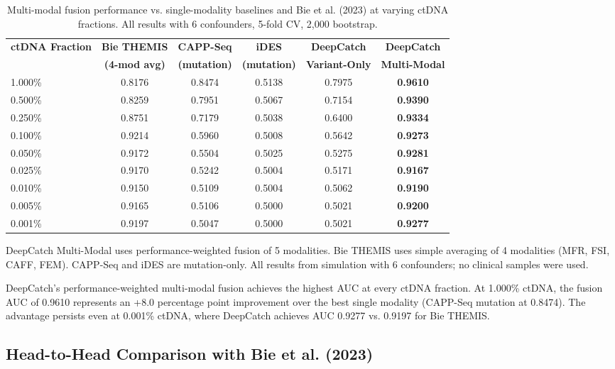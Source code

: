 \documentclass[10pt,a4paper]{article}
\begin{document}
\begin{table}[H]
\centering
\caption{Multi-modal fusion performance vs. single-modality baselines and Bie et al. (2023) at varying ctDNA fractions. All results with 6 confounders, 5-fold CV, 2,000 bootstrap.}
\label{tab:fusion_by_ctdna}
\begin{tabular}{l c c c c c}
\toprule
\textbf{ctDNA Fraction} & \textbf{Bie THEMIS} & \textbf{CAPP-Seq} & \textbf{iDES} & \textbf{DeepCatch} & \textbf{DeepCatch} \\
 & \textbf{(4-mod avg)} & \textbf{(mutation)} & \textbf{(mutation)} & \textbf{Variant-Only} & \textbf{Multi-Modal} \\
\midrule
1.000\% & 0.8176 & 0.8474 & 0.5138 & 0.7975 & \textbf{0.9610} \\
0.500\% & 0.8259 & 0.7951 & 0.5067 & 0.7154 & \textbf{0.9390} \\
0.250\% & 0.8751 & 0.7179 & 0.5038 & 0.6400 & \textbf{0.9334} \\
0.100\% & 0.9214 & 0.5960 & 0.5008 & 0.5642 & \textbf{0.9273} \\
0.050\% & 0.9172 & 0.5504 & 0.5025 & 0.5275 & \textbf{0.9281} \\
0.025\% & 0.9170 & 0.5242 & 0.5004 & 0.5171 & \textbf{0.9167} \\
0.010\% & 0.9150 & 0.5109 & 0.5004 & 0.5062 & \textbf{0.9190} \\
0.005\% & 0.9165 & 0.5106 & 0.5000 & 0.5021 & \textbf{0.9200} \\
0.001\% & 0.9197 & 0.5047 & 0.5000 & 0.5021 & \textbf{0.9277} \\
\bottomrule
\end{tabular}
\vspace{0.3cm}
\footnotesize{DeepCatch Multi-Modal uses performance-weighted fusion of 5 modalities. Bie THEMIS uses simple averaging of 4 modalities (MFR, FSI, CAFF, FEM). CAPP-Seq and iDES are mutation-only. All results from simulation with 6 confounders; no clinical samples were used.}
\end{table}

DeepCatch's performance-weighted multi-modal fusion achieves the highest AUC at every ctDNA fraction. At 1.000\% ctDNA, the fusion AUC of 0.9610 represents an +8.0 percentage point improvement over the best single modality (CAPP-Seq mutation at 0.8474). The advantage persists even at 0.001\% ctDNA, where DeepCatch achieves AUC 0.9277 vs. 0.9197 for Bie THEMIS.

\subsection{Head-to-Head Comparison with Bie et al. (2023)}
\end{document}
